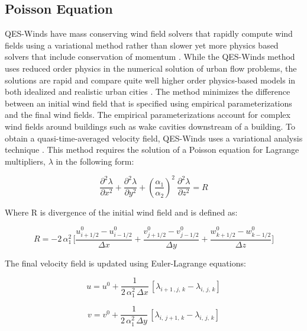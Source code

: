 \subsection{Poisson Equation}

QES-Winds have mass conserving wind field solvers that rapidly compute wind fields using a variational method rather than slower yet more physics based solvers that include conservation of momentum \cite{kim2014effects}. While the QES-Winds method uses reduced order physics in the numerical solution of urban flow problems, the solutions are rapid and compare quite well higher order physics-based models in both idealized \cite{hayati2017comprehensive} and realistic urban cities \cite{neophytou2011inter}. The method minimizes the difference between an initial wind field that is specified using empirical parameterizations \cite{singh2008evaluation} and the final wind fields. The empirical parameterizations account for complex wind fields around buildings such as wake cavities downstream of a building. To obtain a quasi-time-averaged velocity field, QES-Winds uses a variational analysis technique \cite{singh2008evaluation}. This method requires the solution of a Poisson equation for Lagrange multipliers, $\lambda$ in the following form:

\begin{equation} \label{poisson}
\frac{\partial^2\lambda}{\partial x^2} + \frac{\partial^2\lambda}{\partial y^2} + (\frac{\alpha_1}{\alpha_2})^2\:  \frac{\partial^2\lambda}{\partial z^2} = R
\end{equation}

Where R is divergence of the initial wind field and is defined as:

\begin{equation} \label{divergence}
 R = -2\,\alpha_1^2\,\Bigg[\frac{u_{i+1/2}^0-u_{i-1/2}^0}{\Delta x} + \frac{v_{j+1/2}^0-v_{j-1/2}^0}{\Delta y} + \frac{w_{k+1/2}^0-w_{k-1/2}^0}{\Delta z}\Bigg]
\end{equation}

The final velocity field is updated using Euler-Lagrange equations:

 \begin{equation} \label{eu-lag1}
 u = u^0 + \frac{1}{2\,\alpha_1^2\,\Delta x}\,[\lambda_{i+1\,,j,\,k}-\lambda_{i,\,j,\,k}]
\end{equation}

\begin{equation}
\label{eu-lag2}
 v = v^0 + \frac{1}{2\,\alpha_1^2\,\Delta y}\,[\lambda_{i,\,j+1,\,k}-\lambda_{i,\,j,\,k}]
\end{equation}


